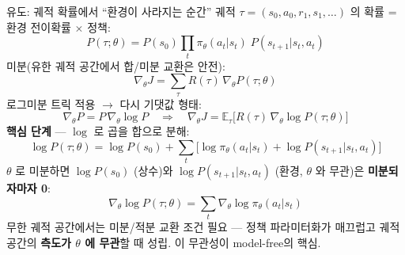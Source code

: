 \begin{frame}{유도: 궤적 확률에서 ``환경이 사라지는 순간''}
  \small
  궤적 $\tau=(s_0,a_0,r_1,s_1,\dots)$ 의 확률 = 환경 전이확률 $\times$
  정책:
  \[
  P(\tau;\theta) = P(s_0)\prod_t \pi_\theta(a_t|s_t)\; P(s_{t+1}|s_t, a_t)
  \]
  미분(유한 궤적 공간에서 합/미분 교환은 안전):
  \[
  \nabla_\theta J
  = \sum_\tau R(\tau)\, \nabla_\theta P(\tau;\theta)
  \]
  로그미분 트릭 적용 $\to$ 다시 기댓값 형태:
  \[
  \nabla_\theta P = P\, \nabla_\theta \log P
  \quad\Rightarrow\quad
  \nabla_\theta J = \mathbb{E}_\tau\big[ R(\tau)\,
  \nabla_\theta \log P(\tau;\theta) \big]
  \]
  \textbf{핵심 단계} --- $\log$ 로 곱을 합으로 분해:
  \[
  \log P(\tau;\theta) = \log P(s_0) + \sum_t
  \big[ \log\pi_\theta(a_t|s_t) + \log P(s_{t+1}|s_t, a_t) \big]
  \]
  $\theta$ 로 미분하면 $\log P(s_0)$ (상수)와
  $\log P(s_{t+1}|s_t,a_t)$ (환경, $\theta$ 와 무관)은
  \textbf{미분되자마자 0}:
  \[
  \nabla_\theta \log P(\tau;\theta) = \sum_t \nabla_\theta
  \log\pi_\theta(a_t|s_t)
  \]
  \normalsize
  {\footnotesize 무한 궤적 공간에서는 미분/적분 교환 조건 필요 ---
  정책 파라미터화가 매끄럽고 궤적 공간의 \textbf{측도가 $\theta$ 에
  무관}할 때 성립. 이 무관성이 model-free의 핵심.}
\end{frame}

